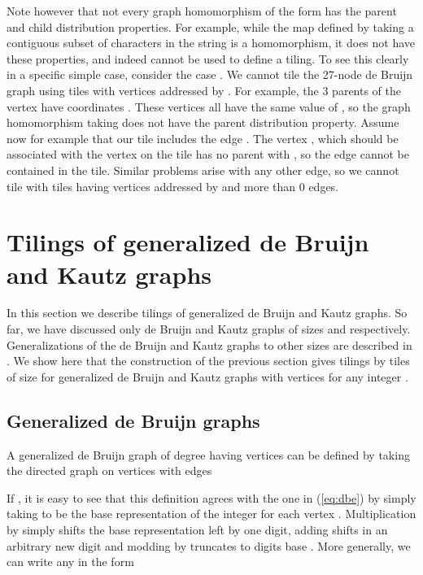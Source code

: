 \documentclass[12pt]{article}
\begin{document}
Note however that not every graph homomorphism of the form  has the parent and child distribution
properties.  For example, while the map  defined by taking a contiguous subset  of  characters in the string 
is a homomorphism, it does not have these properties, and indeed
cannot be used to define a tiling.  To see this clearly in a specific
simple case, consider the case .  We cannot tile the
27-node de Bruijn graph  using tiles with vertices
addressed by .  For example, the 3 parents of the vertex
 have coordinates .  These vertices
all have the same value of , so the graph homomorphism
taking  does not have the parent
distribution property.  Assume  now for example that our tile includes the
edge .  The vertex , which should be associated with
the vertex  on the tile has no parent with , so the
edge  cannot be contained in the tile.  Similar problems
arise with any other edge, so we cannot tile  with tiles
having vertices addressed by  and more than 0 edges.

\section{Tilings of generalized de Bruijn and Kautz graphs}
\label{sec:generalized}

In this section we describe tilings of generalized de Bruijn and
Kautz graphs.
So far, we have discussed only  de Bruijn  and Kautz graphs
of sizes  and  respectively.
Generalizations of the de Bruijn and Kautz graphs to other sizes are
described in \cite{ii1, ii2, rpk, dch}.
We show here that the construction of the previous section gives
tilings by tiles of size   for generalized de Bruijn and Kautz
graphs with  vertices for any integer .  

\subsection{Generalized de Bruijn graphs}

A generalized de Bruijn graph of degree  having  vertices can be
defined by taking the directed graph on vertices  with
edges

If , it is easy to see that this definition agrees with the
one in (\ref{eq:dbe}) by simply taking  to be the base
 representation of the integer  for each vertex .
Multiplication by  simply shifts the base  representation left
by one digit, adding  shifts in an arbitrary new digit 
and modding by  truncates to  digits base .
More generally, we can write any   in the form
\end{document}
